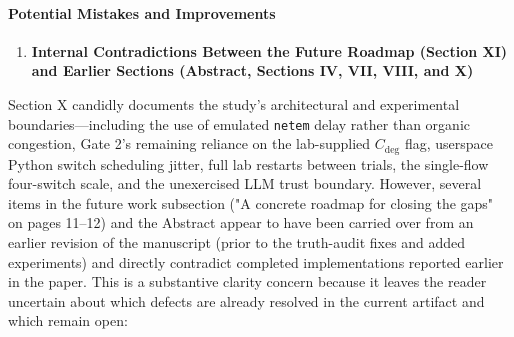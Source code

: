 \documentclass[11pt,a4paper]{article}
\begin{document}
\paragraph{Potential Mistakes and Improvements}
\begin{enumerate}[leftmargin=1.6em,itemsep=3pt]
\item \textbf{Internal Contradictions Between the Future Roadmap (Section XI) and Earlier Sections (Abstract, Sections IV, VII, VIII, and X)}
\end{enumerate}
Section X candidly documents the study's architectural and experimental boundaries—including the use of emulated \texttt{netem} delay rather than organic congestion, Gate 2's remaining reliance on the lab-supplied $C_{\text{deg}}$ flag, userspace Python switch scheduling jitter, full lab restarts between trials, the single-flow four-switch scale, and the unexercised LLM trust boundary. However, several items in the future work subsection ("A concrete roadmap for closing the gaps" on pages 11–12) and the Abstract appear to have been carried over from an earlier revision of the manuscript (prior to the truth-audit fixes and added experiments) and directly contradict completed implementations reported earlier in the paper. This is a substantive clarity concern because it leaves the reader uncertain about which defects are already resolved in the current artifact and which remain open:
\end{document}

